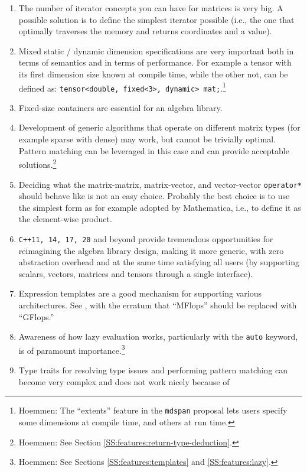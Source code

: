 \begin{enumerate}
\item The number of iterator concepts you can have for matrices is
  very big. A possible solution is to define the simplest iterator
  possible (i.e., the one that optimally traverses the memory and
  returns coordinates and a value).
\item Mixed static / dynamic dimension specifications are very
  important both in terms of semantics and in terms of
  performance. For example a tensor with its first dimension size
  known at compile time, while the other not, can be defined as:
  \texttt{tensor<double, fixed<3>, dynamic> mat;}.\footnote{Hoemmen:
    The ``extents'' feature in the \texttt{mdspan} proposal
    \cite{P0009r8} lets users specify some dimensions at compile time,
    and others at run time.}
\item Fixed-size containers are essential for an algebra library.
\item Development of generic algorithms that operate on different
  matrix types (for example sparse with dense) may work, but cannot be
  trivially optimal. Pattern matching can be leveraged in this case
  and can provide acceptable solutions.\footnote{Hoemmen: See Section
    \ref{SS:features:return-type-deduction}.}
\item Deciding what the matrix-matrix, matrix-vector, and
  vector-vector \texttt{operator*} should behave like is not an easy
  choice. Probably the best choice is to use the simplest form as for
  example adopted by Mathematica, i.e., to define it as the
  element-wise product.
\item \texttt{C++11, 14, 17, 20} and beyond provide tremendous
  opportunities for reimagining the algebra library design, making it
  more generic, with zero abstraction overhead and at the same time
  satisfying all users (by supporting scalars, vectors, matrices and
  tensors through a single interface).
\item Expression templates are a good mechanism for supporting various
  architectures.  See \cite{iliopoulos2011ublascl}, with the erratum
  that ``MFlops'' should be replaced with ``GFlops.''
\item Awareness of how lazy evaluation works, particularly with the
  \texttt{auto} keyword, is of paramount importance.\footnote{Hoemmen:
    See Sections \ref{SS:features:templates} and
    \ref{SS:features:lazy}.}
\item Type traits for resolving type issues and performing pattern
  matching can become very complex and does not work nicely because of

\end{enumerate}
